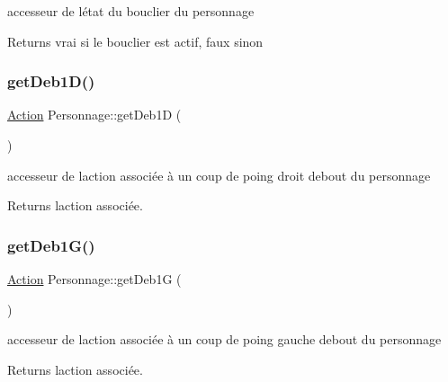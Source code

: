 accesseur de l\textquotesingle{}état du bouclier du personnage 

\begin{DoxyReturn}{Returns}
vrai si le bouclier est actif, faux sinon 
\end{DoxyReturn}
\mbox{\label{class_personnage_a08db6e6280d578c9a6fa7420a4a7dcc3}} 
\subsubsection{\texorpdfstring{get\+Deb1\+D()}{getDeb1D()}}
{\footnotesize\ttfamily \hyperlink{class_action}{Action} Personnage\+::get\+Deb1D (\begin{DoxyParamCaption}{ }\end{DoxyParamCaption})}



accesseur de l\textquotesingle{}action associée à un coup de poing droit debout du personnage 

\begin{DoxyReturn}{Returns}
l\textquotesingle{}action associée. 
\end{DoxyReturn}
\mbox{\label{class_personnage_ab4e39817921a74cb9265307cf52cc3d6}} 
\subsubsection{\texorpdfstring{get\+Deb1\+G()}{getDeb1G()}}
{\footnotesize\ttfamily \hyperlink{class_action}{Action} Personnage\+::get\+Deb1G (\begin{DoxyParamCaption}{ }\end{DoxyParamCaption})}



accesseur de l\textquotesingle{}action associée à un coup de poing gauche debout du personnage 

\begin{DoxyReturn}{Returns}
l\textquotesingle{}action associée. 
\end{DoxyReturn}
\mbox{\label{class_personnage_a5380bd06c8e29368ae0e46069ad527fc}} 
